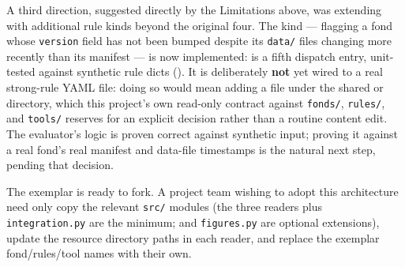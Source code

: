 \documentclass[
]{article}
\begin{document}
A third direction, suggested directly by the Limitations above, was
extending  with additional rule kinds
beyond the original four. The  kind ---
flagging a fond whose \texttt{version} field has not been bumped despite
its \texttt{data/} files changing more recently than its manifest --- is
now implemented:
is a fifth dispatch entry, unit-tested against synthetic rule dicts
(). It is deliberately
\textbf{not} yet wired to a real strong-rule YAML file: doing so would
mean adding a file under the shared
 or
 directory,
which this project's own read-only contract against \texttt{fonds/},
\texttt{rules/}, and \texttt{tools/} reserves for an explicit decision
rather than a routine content edit. The evaluator's logic is proven
correct against synthetic input; proving it against a real fond's real
manifest and data-file timestamps is the natural next step, pending that
decision.

The exemplar is ready to fork. A project team wishing to adopt this
architecture need only copy the relevant \texttt{src/} modules (the
three readers plus \texttt{integration.py} are the minimum;
 and \texttt{figures.py} are optional
extensions), update the resource directory paths in each reader, and
replace the exemplar fond/rules/tool names with their own.



\clearpage


\end{document}
